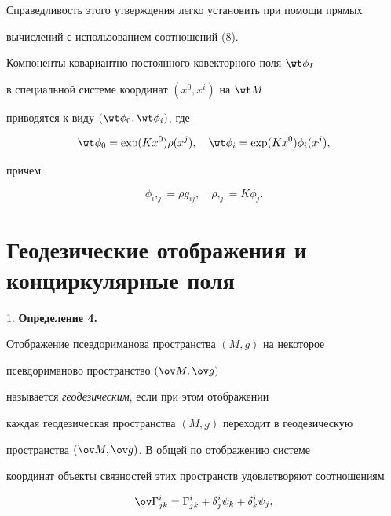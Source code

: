 Справедливость этого утверждения легко установить при помощи прямых 


вычислений с использованием соотношений (8).





\begin{exam}


Компоненты ковариантно постоянного ковекторного поля $\wt \phi_{I}$


в специальной системе координат $(x^0, x^i)$ на $\wt M$


приводятся к виду $(\wt \phi_{0},\wt\phi_{i})$, где


$$


\wt \phi_{0}=\exp(Kx^0) \rho (x^j),


\quad \wt \phi_{i}=\exp(Kx^0) \phi_{i}(x^j),


$$


причем


$$


\phi_{i},_{j}=\rho g_{ij},\quad \rho,_{j}=K\phi_{j}.


$$


\end{exam}





\section{Геодезические отображения и конциркулярные поля}





1. {\bf Определение 4.}


Отображение псевдориманова пространства $(M, g)$ на некоторое 


псевдориманово пространство $(\ov M, \ov g)$ 


называется {\it геодезическим}, если при этом отображении 


каждая геодезическая пространства $(M, g)$ переходит в геодезическую 


пространства $(\ov M, \ov g)$. В общей по отображению системе 


координат объекты связностей этих пространств удовлетворяют соотношениям


\begin{equation}


\ov\Gamma^i_{jk}=\Gamma^i_{jk}+\delta^i_j\psi_{k}+


{\delta}^i_k\psi_{j},


\end{equation}


